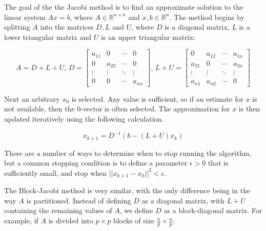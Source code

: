 \documentclass[pageno]{jpaper}
\begin{document}
\begin{doublespacing}
The goal of the the Jacobi method is to find an approximate solution to the linear system $Ax = b$, where $A \in \mathbb{R}^{n \times n}$ and $x, b \in \mathbb{R}^n$. The method begins by splitting $A$ into the matrices $D, L$ and $U$, where $D$ is a diagonal matrix, $L$ is a lower triangular matrix and $U$ is an upper triangular matrix:

$$A = D + L + U, \,
D = \begin{bmatrix} 
a_{11} & 0 & \cdots & 0 \\
0 & a_{22} & \cdots & 0 \\
\vdots & \vdots & \ddots & \vdots \\
0 & 0 & \cdots & a_{nn}
\end{bmatrix}, \, L + U = \begin{bmatrix}
0 & a_{12} & \cdots & a_{1n} \\
a_{21} & 0 & \cdots & a_{2n} \\
\vdots & \vdots & \ddots & \vdots \\
a_{n1} & a_{n2} & \cdots & 0 \end{bmatrix}$$

Next an arbitrary $x_0$ is selected. Any value is sufficient, so if an estimate for $x$ is not available, then the $0$-vector is often selected. The approximation for $x$ is then updated iteratively using the following calculation.

$$x_{k + 1} = D^{-1} (b - (L + U) x_k)$$

There are a number of ways to determine when to stop running the algorithm, but a common stopping condition is to define a parameter $\epsilon > 0$ that is sufficiently small, and stop when $||x_{k + 1} - x_k||^2 < \epsilon$.

The Block-Jacobi method is very similar, with the only difference being in the way $A$ is partitioned. Instead of defining $D$ as a diagonal matrix, with $L + U$ containing the remaining values of $A$, we define $D$ as a block-diagonal matrix. For example, if $A$ is divided into $p \times p$ blocks of size $\frac{n}{p} \times \frac{n}{p}$:


\end{doublespacing}
\end{document}
